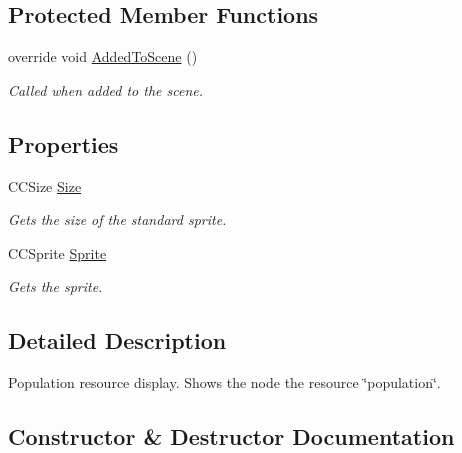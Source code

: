 \subsection*{Protected Member Functions}
\begin{DoxyCompactItemize}
\item 
override void \hyperlink{classClient_1_1Common_1_1Views_1_1HUD_1_1PopulationResource_a816c955ed11e8ccb9add35409770cc48}{Added\+To\+Scene} ()
\begin{DoxyCompactList}\small\item\em Called when added to the scene. \end{DoxyCompactList}\end{DoxyCompactItemize}
\subsection*{Properties}
\begin{DoxyCompactItemize}
\item 
C\+C\+Size \hyperlink{classClient_1_1Common_1_1Views_1_1HUD_1_1PopulationResource_acff3ed91df0d733ecf5abcaff8e4ae6f}{Size}
\begin{DoxyCompactList}\small\item\em Gets the size of the standard sprite. \end{DoxyCompactList}\item 
C\+C\+Sprite \hyperlink{classClient_1_1Common_1_1Views_1_1HUD_1_1PopulationResource_aca81efbdba7d65cb6bc7946ef94b0520}{Sprite}
\begin{DoxyCompactList}\small\item\em Gets the sprite. \end{DoxyCompactList}\end{DoxyCompactItemize}


\subsection{Detailed Description}
Population resource display. Shows the node the resource \char`\"{}population\char`\"{}. 



\subsection{Constructor \& Destructor Documentation}
\hypertarget{classClient_1_1Common_1_1Views_1_1HUD_1_1PopulationResource_a34fce1f70d8da46440900f3861559448}{}
